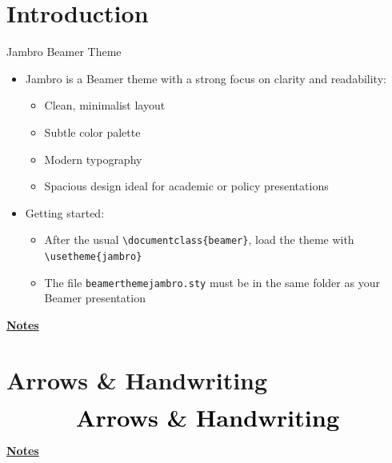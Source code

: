 \documentclass[10pt]{beamer}
\begin{document}
\section{Introduction}
\begin{frame}{Jambro Beamer Theme}
    \small
    \begin{itemize}
        \item Jambro is a Beamer theme with a strong focus on clarity and readability:
        \begin{itemize}
            \item Clean, minimalist layout \smallskip
            \item Subtle color palette \smallskip
            \item Modern typography \smallskip
            \item Spacious design ideal for academic or policy presentations \bigskip
        \end{itemize}
        \item Getting started:
        \begin{itemize}
            \item After the usual \texttt{\textbackslash documentclass\{beamer\}}, load the theme with \texttt{\textbackslash usetheme\{jambro\}} \smallskip
            \item The file \texttt{beamerthemejambro.sty} must be in the same folder as your Beamer presentation
        \end{itemize}
    \end{itemize}
\end{frame}
\begin{flushleft}
    \underline{\textbf{Notes}}\setlength{\parskip}{.15cm}\notesize\newline\par
\end{flushleft}

\section{Arrows \& Handwriting}
\begin{frame}
    \begin{eqnarray*}
        &\text{{\huge \textbf{Arrows \& Handwriting}}}\\
    \end{eqnarray*}
\end{frame}
\begin{flushleft}
    \underline{\textbf{Notes}}\setlength{\parskip}{.15cm}\notesize\newline\par
\end{flushleft}
\end{document}
